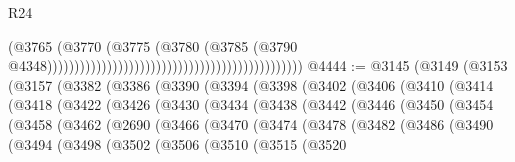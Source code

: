 \begin{lexlean}{R24}
\begin{coremodule}
{{{{{{{{{{{{{{{{{{{{{{{{{{{{{{{{{{{{{{{{{{{{{{{{{{{{{{{{{{{{{{{{{{{{{{{{{{{{{{{{{{{{{{{{{{{{{{{{{{{{{{{{{{{{{{{{{{{{{{{{{{{{{{{{{{{{{{{{{{{{{{{{{{{{{{{{{{{{{{{{{{{{{{{{{{{{{{{{{{{{{{{{{{{{{{{{{{{                                                                                      (@3765
                                                                                        (@3770
                                                                                          (@3775
                                                                                            (@3780
                                                                                              (@3785
                                                                                                (@3790
                                                                                                  @4348)))))))))))))))))))))))))))))))))))))))))))))))
@4444 := @3145
    (@3149
      (@3153
        (@3157
          (@3382
            (@3386
              (@3390
                (@3394
                  (@3398
                    (@3402
                      (@3406
                        (@3410
                          (@3414
                            (@3418
                              (@3422
                                (@3426
                                  (@3430
                                    (@3434
                                      (@3438
                                        (@3442
                                          (@3446
                                            (@3450
                                              (@3454
                                                (@3458
                                                  (@3462
                                                    (@2690
                                                      (@3466
                                                        (@3470
                                                          (@3474
                                                            (@3478
                                                              (@3482
                                                                (@3486
                                                                  (@3490
                                                                    (@3494
                                                                      (@3498
                                                                        (@3502
                                                                          (@3506
                                                                            (@3510
                                                                              (@3515
                                                                                (@3520
}}}}}}}}}}}}}}}}}}}}}}}}}}}}}}}}}}}}}}}}}}}}}}}}}}}}}}}}}}}}}}}}}}}}}}}}}}}}}}}}}}}}}}}}}}}}}}}}}}}}}}}}}}}}}}}}}}}}}}}}}}}}}}}}}}}}}}}}}}}}}}}}}}}}}}}}}}}}}}}}}}}}}}}}}}}}}}}}}}}}}}}}}}}}}}}}}}}
\end{coremodule}
\end{lexlean}
